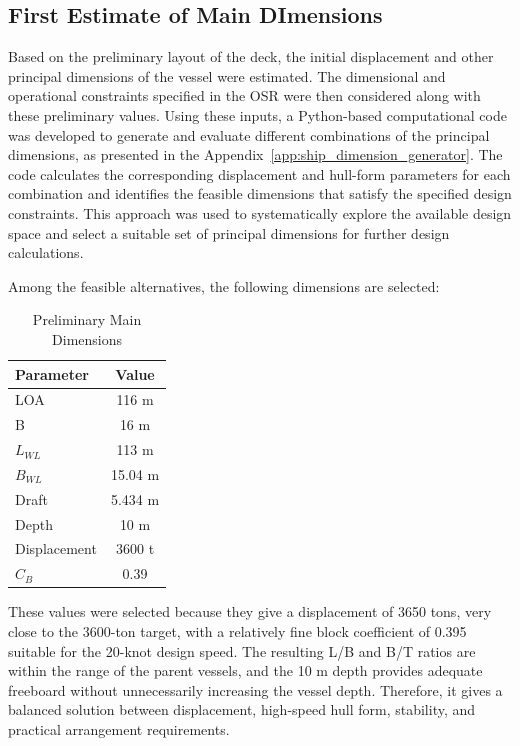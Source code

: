\documentclass[12pt,a4paper,twoside]{report}
\begin{document}
\subsection{First Estimate of Main DImensions}
Based on the preliminary layout of the deck, the initial displacement and other principal dimensions of the vessel were estimated. The dimensional and operational constraints specified in the OSR were then considered along with these preliminary values. Using these inputs, a Python-based computational code was developed to generate and evaluate different combinations of the principal dimensions, as presented in the Appendix~\ref{app:ship_dimension_generator}. The code calculates the corresponding displacement and hull-form parameters for each combination and identifies the feasible dimensions that satisfy the specified design constraints. This approach was used to systematically explore the available design space and select a suitable set of principal dimensions for further design calculations.
\vspace{\baselineskip}\par\noindent Among the feasible alternatives, the following dimensions are selected:
\begin{table}[htbp]
    \centering
    \caption{Preliminary Main Dimensions}
    \label{tab:preliminary_main_dimensions}

    \begin{tabular}{lc}
        \toprule
        \textbf{Parameter} & \textbf{Value} \\
        \midrule
        LOA          & 116 m \\
        B            & 16 m \\
        $L_{WL}$     & 113 m \\
        $B_{WL}$     & 15.04 m \\
        Draft        & 5.434 m \\
        Depth        & 10 m \\
        Displacement & 3600 t \\
        $C_B$        & 0.39 \\
        \bottomrule
    \end{tabular}
\end{table}
These values were selected because they give a displacement of 3650 tons, very close to the 3600-ton target, with a relatively fine block coefficient of 0.395 suitable for the 20-knot design speed. The resulting L/B and B/T ratios are within the range of the parent vessels, and the 10 m depth provides adequate freeboard without unnecessarily increasing the vessel depth. Therefore, it gives a balanced solution between displacement, high-speed hull form, stability, and practical arrangement requirements.
\end{document}
